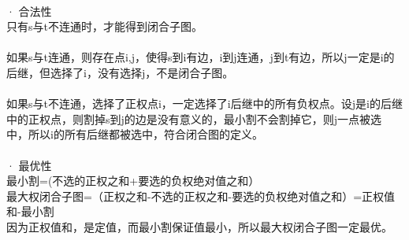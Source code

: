 \documentclass[twoside]{article}
\begin{document}
\\
· 合法性\\
只有s与t不连通时，才能得到闭合子图。\\
\\
如果s与t连通，则存在点i,j，使得s到i有边，i到j连通，j到t有边，所以j一定是i的后继，但选择了i，没有选择j，不是闭合子图。\\
\\
如果s与t不连通，选择了正权点i，一定选择了i后继中的所有负权点。设j是i的后继中的正权点，则割掉s到j的边是没有意义的，最小割不会割掉它，则j一点被选中，所以i的所有后继都被选中，符合闭合图的定义。\\
\\
· 最优性\\
最小割=(不选的正权之和+要选的负权绝对值之和） \\
最大权闭合子图=（正权之和-不选的正权之和-要选的负权绝对值之和）=正权值和-最小割 \\
因为正权值和，是定值，而最小割保证值最小，所以最大权闭合子图一定最优。\\
\end{document}
